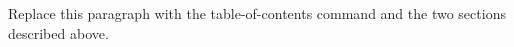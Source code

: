 \documentclass{article}
\begin{document}
Replace this paragraph with the table-of-contents command and the two
sections described above.
\end{document}
